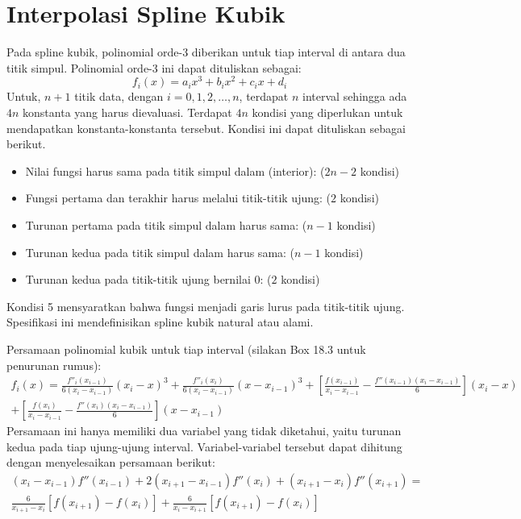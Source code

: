 \section{Interpolasi Spline Kubik}

Pada spline kubik, polinomial orde-3 diberikan untuk tiap interval di antara dua titik simpul.
Polinomial orde-3 ini dapat dituliskan sebagai:
$$
f_i(x) = a_i x^3 + b_i x^2 + c_i x + d_i
$$
Untuk, $n+1$ titik data, dengan $i=0,1,2,\ldots,n$, terdapat $n$ interval sehingga ada $4n$ konstanta yang harus dievaluasi. Terdapat $4n$ kondisi yang diperlukan untuk mendapatkan konstanta-konstanta tersebut. Kondisi ini dapat dituliskan sebagai berikut.
\begin{itemize}
\item Nilai fungsi harus sama pada titik simpul dalam (interior): ($2n-2$ kondisi)
\item Fungsi pertama dan terakhir harus melalui titik-titik ujung: ($2$ kondisi)
\item Turunan pertama pada titik simpul dalam harus sama: ($n-1$ kondisi)
\item Turunan kedua pada titik simpul dalam harus sama: ($n-1$ kondisi)
\item Turunan kedua pada titik-titik ujung bernilai 0: ($2$ kondisi)
\end{itemize}
Kondisi 5 mensyaratkan bahwa fungsi menjadi garis lurus pada titik-titik ujung. Spesifikasi ini mendefinisikan spline kubik natural atau alami.

Persamaan polinomial kubik untuk tiap interval (silakan Box 18.3 untuk penurunan rumus):
\begin{multline}
f_{i}(x) =
\frac{f''_{i}(x_{i-1})}{6(x_{i} - x_{i-1})}(x_{i} - x)^3 +
\frac{f''_{i}(x_{i})}{6(x_{i} - x_{i-1})}(x - x_{i-1})^3
 + \left[
\frac{f(x_{i-1})}{x_{i} - x_{i-1}} - \frac{f''(x_{i-1}) (x_i - x_{i-1})}{6}
\right] (x_i - x) \\
 + \left[
\frac{f(x_{i})}{x_{i} - x_{i-1}} - \frac{f''(x_{i}) (x_i - x_{i-1})}{6}
\right] (x - x_{i-1})
\label{eq:cubicspline}
\end{multline}
Persamaan ini hanya memiliki dua variabel yang tidak diketahui, yaitu turunan kedua
pada tiap ujung-ujung interval. Variabel-variabel tersebut dapat dihitung dengan menyelesaikan
persamaan berikut:
\begin{multline}
(x_i - x_{i-1}) f''(x_{i-1}) + 2(x_{i+1} - x_{i-1}) f''(x_{i}) + (x_{i+1} - x_{i})f''(x_{i+1}) = \\
\frac{6}{x_{i+1} - x_{i}} \left[ f(x_{i+1}) - f(x_i) \right] +
\frac{6}{x_{i} - x_{i+1}} \left[ f(x_{i+1}) - f(x_i) \right]
\label{eq:tridiagsys}
\end{multline}

